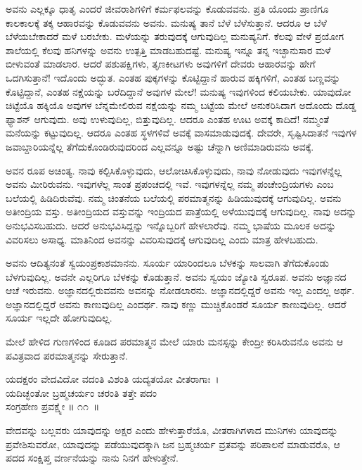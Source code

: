 ಅವನು ಎಲ್ಲಕ್ಕೂ ಧಾತೃ ಎಂದರೆ ಜೀವರಾಶಿಗಳಿಗೆ ಕರ್ಮಫಲವನ್ನು ಕೊಡುವವನು. ಪ್ರತಿ ಯೊಂದು ಪ್ರಾಣಿಗೂ ಕಾಲಕಾಲಕ್ಕೆ ತಕ್ಕ ಆಹಾರವನ್ನು ಕೊಡುವವನು ಅವನು. ಮನುಷ್ಯ ತಾನೆ ಬೆಳೆ ಬೆಳೆಸುತ್ತಾನೆ. ಆದರೂ ಆ ಬೆಳೆ ಬೆಳೆಯಬೇಕಾದರೆ ಮಳೆ ಬರಬೇಕು. ಮಳೆಯನ್ನು ತರುವುದಕ್ಕೆ ಆಗುವುದಿಲ್ಲ ಮನುಷ್ಯನಿಗೆ. ಕೆಲವು ವೇಳೆ ಪ್ರಯೋಗ ಶಾಲೆಯಲ್ಲಿ ಕೆಲವು ಹನಿಗಳನ್ನು ಅವನು ಉತ್ಪತ್ತಿ ಮಾಡಬಹುದಷ್ಟೆ. ಮನುಷ್ಯ ಇನ್ನೂ ತನ್ನ ಇಚ್ಛಾನುಸಾರ ಮಳೆ ಬೀಳುವಂತೆ ಮಾಡಲಾರ. ಆದರೆ ಪಶುಪಕ್ಷಿಗಳು, ತೃಣಕೀಟಗಳು ಅವುಗಳಿಗೆ ದೇವರು ಆಹಾರವನ್ನು ಹೇಗೆ ಒದಗಿಸುತ್ತಾನೆ! ಇದೊಂದು ಅದ್ಭುತ. ಎಂತಹ ಪುಕ್ಕಗಳನ್ನು ಕೊಟ್ಟಿದ್ದಾನೆ ಹಾರುವ ಹಕ್ಕಿಗಳಿಗೆ, ಎಂತಹ ಬಣ್ಣವನ್ನು ಕೊಟ್ಟಿದ್ದಾನೆ, ಎಂತಹ ನಕ್ಷೆಯನ್ನು ಬರೆದಿದ್ದಾನೆ ಅವುಗಳ ಮೇಲೆ! ಮನುಷ್ಯ ಇವುಗಳಿಂದ ಕಲಿಯಬೇಕು. ಯಾವುದೋ ಚಿಟ್ಟೆಯೊ ಹಕ್ಕಿಯೊ ಅವುಗಳ ಬೆನ್ನಮೇಲಿರುವ ನಕ್ಷೆಯನ್ನು ನಮ್ಮ ಬಟ್ಟೆಯ ಮೇಲೆ ಅನುಕರಿಸಿದಾಗ ಅದೊಂದು ದೊಡ್ಡ ಫ್ಯಾಶನ್ ಆಗುವುದು. ಅವು ಉಳುವುದಿಲ್ಲ, ಬಿತ್ತುವುದಿಲ್ಲ. ಆದರೂ ಎಂತಹ ಊಟ ಅವಕ್ಕೆ ಕಾದಿದೆ! ನಮ್ಮಂತೆ ಮನೆಯನ್ನು ಕಟ್ಟುವುದಿಲ್ಲ. ಆದರೂ ಎಂತಹ ಸ್ಥಳಗಳಿವೆ ಅವಕ್ಕೆ ವಾಸಮಾಡುವುದಕ್ಕೆ. ದೇವರೇ, ಸೃಷ್ಟಿಸಿದಾತನೆ ಇವುಗಳ ಜವಾಬ್ದಾರಿಯನ್ನೆಲ್ಲ ತೆಗೆದುಕೊಂಡಿರುವುದರಿಂದ ಎಲ್ಲವನ್ನೂ ಅಷ್ಟು ಚೆನ್ನಾಗಿ ಅಣಿಮಾಡಿರುವನು ಅವಕ್ಕೆ.

ಅವನ ರೂಪ ಅಚಿಂತ್ಯ. ನಾವು ಕಲ್ಪಿಸಿಕೊಳ್ಳುವುದು, ಆಲೋಚಿಸಿಕೊಳ್ಳುವುದು, ನಾವು ನೋಡುವುದು ಇವುಗಳನ್ನೆಲ್ಲ ಅವನು ಮೀರಿರುವನು. ಇವುಗಳೆಲ್ಲ ಸಾಂತ ಪ್ರಪಂಚದಲ್ಲಿ ಇವೆ. ಇವುಗಳನ್ನೆಲ್ಲ ನಮ್ಮ ಪಂಚೇಂದ್ರಿಯಗಳು ಎಂಬ ಬಲೆಯಲ್ಲಿ ಹಿಡಿದಿರುವೆವು. ನಮ್ಮ ಚಿಂತನೆಯ ಬಲೆಯಲ್ಲಿ ಪರಮಾತ್ಮನನ್ನು ಹಿಡಿಯುವುದಕ್ಕೆ ಆಗುವುದಿಲ್ಲ. ಅವನು ಅತೀಂದ್ರಿಯ ವಸ್ತು. ಅತೀಂದ್ರಿಯದ ವಸ್ತುವನ್ನು ಇಂದ್ರಿಯದ ಪಾತ್ರೆಯಲ್ಲಿ ಅಳೆಯುವುದಕ್ಕೆ ಆಗುವುದಿಲ್ಲ. ನಾವು ಅದನ್ನು ಅನುಭವಿಸಬಹುದು. ಆದರೆ ಅನುಭವಿಸಿದ್ದನ್ನು ಇನ್ನೊಬ್ಬರಿಗೆ ಹೇಳಲಾರೆವು. ನಮ್ಮ ಭಾಷೆಯ ಮೂಲಕ ಅದನ್ನು ವಿವರಿಸಲು ಅಸಾಧ್ಯ. ಮಾತಿನಿಂದ ಅವನನ್ನು ವಿವರಿಸುವುದಕ್ಕೆ ಆಗುವುದಿಲ್ಲ ಎಂದು ಮಾತ್ರ ಹೇಳಬಹುದು.

ಅವನು ಆದಿತ್ಯನಂತೆ ಸ್ವಯಂಪ್ರಕಾಶಮಾನನು. ಸೂರ್ಯ ಯಾರಿಂದಲೂ ಬೆಳಕನ್ನು ಸಾಲವಾಗಿ ತೆಗೆದುಕೊಂಡು ಬೆಳಗುವುದಿಲ್ಲ. ಅವನೇ ಎಲ್ಲರಿಗೂ ಬೆಳಕನ್ನು ಕೊಡುತ್ತಾನೆ. ಅವನು ಸ್ವಯಂ ಜ್ಯೋತಿ ಸ್ವರೂಪ. ಅವನು ಅಜ್ಞಾನದ ಆಚೆ ಇರುವನು. ಅಜ್ಞಾನದಲ್ಲಿರುವವನು ಅವನನ್ನು ನೋಡಲಾರನು. ಅಜ್ಞಾನದಲ್ಲಿದ್ದರೆ ಅವನು ಇಲ್ಲ ಎಂದಲ್ಲ ಅರ್ಥ. ಅಜ್ಞಾನದಲ್ಲಿದ್ದರೆ ಅವನು ಕಾಣುವುದಿಲ್ಲ ಎಂದರ್ಥ. ನಾವು ಕಣ್ಣು ಮುಚ್ಚಿಕೊಂಡರೆ ಸೂರ್ಯ ಕಾಣುವುದಿಲ್ಲ. ಆದರೆ ಸೂರ್ಯ ಇಲ್ಲದೇ ಹೋಗುವುದಿಲ್ಲ.

\newpage

ಮೇಲೆ ಹೇಳಿದ ಗುಣಗಳಿಂದ ಕೂಡಿದ ಪರಮಾತ್ಮನ ಮೇಲೆ ಯಾರು ಮನಸ್ಸನ್ನು ಕೇಂದ್ರೀ ಕರಿಸಿರುವನೊ ಅವನು ಆ ಪವಿತ್ರವಾದ ಪರಮಾತ್ಮನನ್ನು ಸೇರುತ್ತಾನೆ.

\begin{shloka}
ಯದಕ್ಷರಂ ವೇದವಿದೋ ವದಂತಿ ವಿಶಂತಿ ಯದ್ಯತಯೋ ವೀತರಾಗಾಃ~।\\ಯದಿಚ್ಛಂತೋ ಬ್ರಹ್ಮಚರ್ಯಂ ಚರಂತಿ ತತ್ತೇ ಪದಂ\\ ಸಂಗ್ರಹೇಣ ಪ್ರವಕ್ಷ್ಯೇ \hfill॥ ೧೧~॥
\end{shloka}

\begin{artha}
ವೇದವನ್ನು ಬಲ್ಲವರು ಯಾವುದನ್ನು ಅಕ್ಷರ ಎಂದು ಹೇಳುತ್ತಾರೆಯೊ, ವೀತರಾಗಿಗಳಾದ ಮುನಿಗಳು ಯಾವುದನ್ನು ಪ್ರವೇಶಿಸುವರೋ, ಯಾವುದನ್ನು ಪಡೆಯುವುದಕ್ಕಾಗಿ ಜನ ಬ್ರಹ್ಮಚರ್ಯ ವ್ರತವನ್ನು ಪರಿಪಾಲನೆ ಮಾಡುವರೊ, ಆ ಪದದ ಸಂಕ್ಷಿಪ್ತ ವರ್ಣನೆಯನ್ನು ನಾನು ನಿನಗೆ ಹೇಳುತ್ತೇನೆ.
\end{artha}

